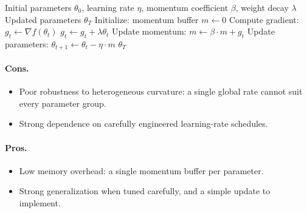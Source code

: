\begin{algorithm}[H]
\caption{SGD with Momentum}
\label{alg:sgd-momentum}
\begin{algorithmic}[1]
\Require Initial parameters $\theta_0$, learning rate $\eta$, momentum coefficient $\beta$, weight decay $\lambda$
\Ensure Updated parameters $\theta_T$
\State Initialize: momentum buffer $m \gets 0$
    \State Compute gradient: $g_t \gets \nabla f(\theta_t)$
        \State $g_t \gets g_t + \lambda \theta_t$ 
    \EndIf
    \State Update momentum: $m \gets \beta \cdot m + g_t$
    \State Update parameters: $\theta_{t+1} \gets \theta_t - \eta \cdot m$
\EndFor
\Return $\theta_T$
\end{algorithmic}
\end{algorithm}

\paragraph{Cons.}
\begin{itemize}[leftmargin=*]
\item Poor robustness to heterogeneous curvature: a single global rate cannot suit every parameter group.
\item Strong dependence on carefully engineered learning-rate schedules.
\end{itemize}

\paragraph{Pros.}
\begin{itemize}[leftmargin=*]
\item Low memory overhead: a single momentum buffer per parameter.
\item Strong generalization when tuned carefully, and a simple update to implement.
\end{itemize}

